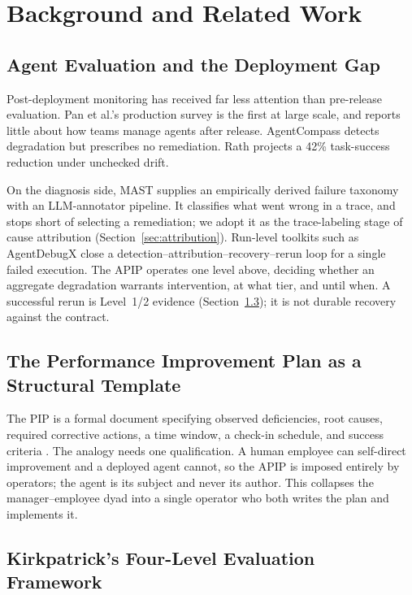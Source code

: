 \documentclass[conference]{IEEEtran}
\begin{document}
\section{Background and Related Work}

\subsection{Agent Evaluation and the Deployment Gap}

Post-deployment monitoring has received far less attention than pre-release
evaluation. Pan et al.'s production survey \cite{pan2025} is the first at large
scale, and reports little about how teams manage agents after release.
AgentCompass \cite{sapra2025} detects degradation but prescribes no
remediation. Rath \cite{rath2026} projects a 42\% task-success reduction under
unchecked drift.

On the diagnosis side, MAST \cite{cemri2025} supplies an empirically derived
failure taxonomy with an LLM-annotator pipeline. It classifies what went wrong
in a trace, and stops short of selecting a remediation; we adopt it as the
trace-labeling stage of cause attribution (Section~\ref{sec:attribution}).
Run-level toolkits such as AgentDebugX \cite{zhu2026} close a
detection--attribution--recovery--rerun loop for a single failed execution. The
APIP operates one level above, deciding whether an aggregate degradation
warrants intervention, at what tier, and until when. A successful rerun is
Level~1/2 evidence (Section~\ref{sec:kirkpatrick}); it is not durable recovery
against the contract.

\subsection{The Performance Improvement Plan as a Structural Template}

The PIP is a formal document specifying observed deficiencies, root causes,
required corrective actions, a time window, a check-in schedule, and success
criteria \cite{shrm2023}.
The analogy needs one qualification. A human employee can self-direct
improvement and a deployed agent cannot, so the APIP is imposed entirely by
operators; the agent is its subject and never its author. This collapses the
manager--employee dyad into a single operator who both writes the plan and
implements it.

\subsection{Kirkpatrick's Four-Level Evaluation Framework}
\label{sec:kirkpatrick}
\end{document}
